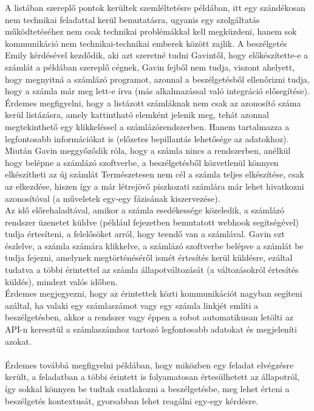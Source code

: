 A listában szereplő pontok kerültek szemléltetésre  példában, itt egy szándékosan nem technikai feladattal kerül bemutatásra, ugyanis egy szolgáltatás működtetéséhez nem csak technikai problémákkal kell megküzdeni, hanem sok kommunikáció nem technikai-technikai emberek között zajlik.
A beszélgetés Emily kérdésével kezdődik, aki azt szeretné tudni Gavintől, hogy előkészítette-e a számlát a példában szereplő cégnek, Gavin fejből nem tudja, viszont ahelyett, hogy megnyitná a számlázó programot, azonnal a beszélgetésből ellenőrizni tudja, hogy a számla már meg lett-e írva (más alkalmazással való integráció elősegítése). Érdemes megfigyelni, hogy a listázott számláknak nem csak az azonosító száma kerül listázásra, amely kattintható elemként jelenik meg, tehát azonnal megtekinthető egy klikkeléssel a számlázórendszerben. Hanem tartalmazza a legfontosabb információkat is (előzetes bepillantás lehetősége az adatokhoz).\hfill\\
Miután Gavin meggyőződik róla, hogy a számla nincs a rendszerben, anélkül hogy belépne a számlázó szoftverbe, a beszélgetésből közvetlenül könnyen elkészítheti az új számlát Természetesen nem cél a számla teljes elkészítése, csak az elkezdése, hiszen így a már létrejövő piszkozati számlára már lehet hivatkozni azonosítóval (a műveletek egy-egy fázisának kiszervezése).\hfill\\
Az idő előrehaladtával, amikor a számla esedékessége közeledik, a számlázó rendszer üzenetet küldve (például  fejezetben bemutatott webhook segítségével) tudja értesíteni, a felelősöket arról, hogy teendő van a számlával. Gavin ezt észlelve, a számla számára klikkelve, a számlázó szoftverbe belépve a számlát be tudja fejezni, amelynek megtörténéséről ismét értesítés kerül küldésre, ezáltal tudatva a többi érintettel az számla állapotváltozását (a változásokról értesítés küldés), mindezt valós időben.\hfill\\
Érdemes megjegyezni, hogy az érintettek közti kommunikációt nagyban segíteni azáltal, ha valaki egy számlaszámot vagy egy számla linkjét említi a beszélgetésben, akkor a rendszer vagy éppen a robot automatikusan letölti az API-n keresztül a számlaszámhoz tartozó legfontosabb adatokat és megjeleníti azokat.\\
\hfill\\
Érdemes továbbá megfigyelni  példában, hogy miközben egy feladat elvégzésre került, a feladatban a többi érintett is folyamatosan értesülhetett az állapotról, így sokkal könnyen be tudtak csatlakozni a beszélgetésbe, meg lehet érteni a beszélgetés kontextusát, gyorsabban lehet reagálni egy-egy kérdésre.
